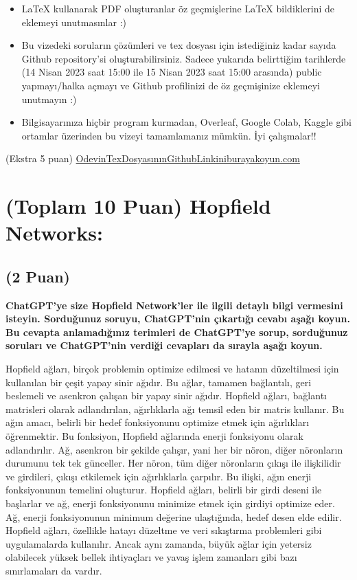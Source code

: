 \documentclass[11pt]{article}
\begin{document}
\begin{itemize}
    \item LaTeX kullanarak PDF oluşturanlar öz geçmişlerine LaTeX bildiklerini de eklemeyi unutmasınlar :)
    \item Bu vizedeki soruların çözümleri ve tex dosyası için istediğiniz kadar sayıda Github repository'si oluşturabilirsiniz. Sadece yukarıda belirttiğim tarihlerde (14 Nisan 2023 saat 15:00 ile 15 Nisan 2023 saat 15:00 arasında) public yapmayı/halka açmayı ve Github profilinizi de öz geçmişinize eklemeyi unutmayın :)
    \item Bilgisayarınıza hiçbir program kurmadan, Overleaf, Google Colab, Kaggle gibi ortamlar üzerinden bu vizeyi tamamlamanız mümkün. İyi çalışmalar!!
\end{itemize}

(Ekstra 5 puan) \url{OdevinTexDosyasınınGithubLinkiniburayakoyun.com}

\newpage
\section{(Toplam 10 Puan) Hopfield Networks:}

\subsection{(2 Puan)} \textbf{ChatGPT’ye size Hopfield Network’ler ile ilgili detaylı bilgi vermesini isteyin. Sorduğunuz soruyu, ChatGPT'nin çıkartığı cevabı aşağı koyun. Bu cevapta anlamadığınız terimleri de ChatGPT’ye sorup, sorduğunuz soruları ve ChatGPT’nin verdiği cevapları da sırayla aşağı koyun.}

Hopfield ağları, birçok problemin optimize edilmesi ve hatanın düzeltilmesi için kullanılan bir çeşit yapay sinir ağıdır. Bu ağlar, tamamen bağlantılı, geri beslemeli ve asenkron çalışan bir yapay sinir ağıdır.
Hopfield ağları, bağlantı matrisleri olarak adlandırılan, ağırlıklarla ağı temsil eden bir matris kullanır. Bu ağın amacı, belirli bir hedef fonksiyonunu optimize etmek için ağırlıkları öğrenmektir. Bu fonksiyon, Hopfield ağlarında enerji fonksiyonu olarak adlandırılır.
Ağ, asenkron bir şekilde çalışır, yani her bir nöron, diğer nöronların durumunu tek tek günceller. Her nöron, tüm diğer nöronların çıkışı ile ilişkilidir ve girdileri, çıkışı etkilemek için ağırlıklarla çarpılır. Bu ilişki, ağın enerji fonksiyonunun temelini oluşturur.
Hopfield ağları, belirli bir girdi deseni ile başlarlar ve ağ, enerji fonksiyonunu minimize etmek için girdiyi optimize eder. Ağ, enerji fonksiyonunun minimum değerine ulaştığında, hedef desen elde edilir.
Hopfield ağları, özellikle hatayı düzeltme ve veri sıkıştırma problemleri gibi uygulamalarda kullanılır. Ancak aynı zamanda, büyük ağlar için yetersiz olabilecek yüksek bellek ihtiyaçları ve yavaş işlem zamanları gibi bazı sınırlamaları da vardır.
\end{document}

